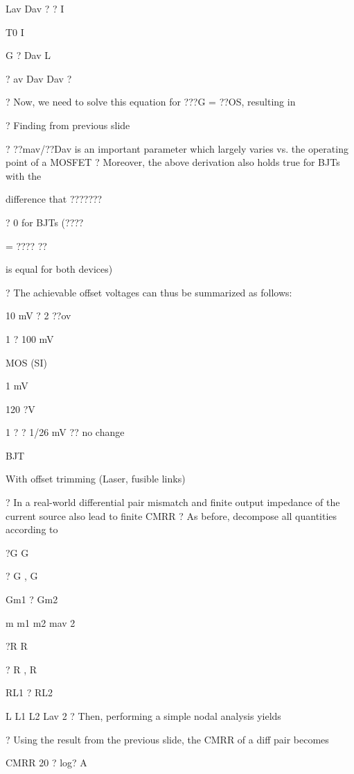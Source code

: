 \documentclass[2pt,landscape]{article}
\begin{document}
\begin{multicols*}{5}
Lav	Dav	? ?	I


T0	I


G ?	Dav	L


?	av	Dav	Dav	?

?	Now, we need to solve this equation for ???G = ??OS, resulting in




?	Finding from previous slide

?	??mav/??Dav is an important parameter which largely varies vs. the 
operating point of a MOSFET
?	Moreover, the above derivation also holds true for BJTs with the


difference that ???????


? 0 for BJTs (????


= ????
??


is equal for both devices)



?	The achievable offset voltages can thus be summarized as follows:



10 mV	?	2
??ov


1
? 100 mV


MOS (SI)


1 mV

120 ?V


1
?	? 1/26 mV
??
no change


BJT

With offset 
trimming 
(Laser, 
fusible links)



?	In a real-world differential pair mismatch and finite output impedance of 
the current source also lead to finite CMRR
?	As before, decompose all quantities according to



?G	G


?	G	, G


Gm1 ? Gm2



m	m1	m2	mav	2


?R    R


?	R , R


RL1 ? RL2



L	L1	L2	Lav	2
?	Then, performing a simple nodal 
analysis yields



?	Using the result from the previous slide, the CMRR of a diff pair 
becomes



CMRR 20 ? log?
A



\end{multicols*}
\end{document}
